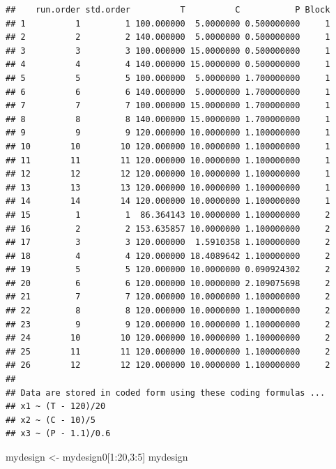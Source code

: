 \documentclass[
]{book}
\newenvironment{Shaded}{\begin{snugshade}}{\end{snugshade}}
\newcommand{\DecValTok}[1]{\textcolor[rgb]{0.00,0.00,0.81}{#1}}
\newcommand{\NormalTok}[1]{#1}
\newcommand{\OtherTok}[1]{\textcolor[rgb]{0.56,0.35,0.01}{#1}}
\newcommand{\SpecialCharTok}[1]{\textcolor[rgb]{0.00,0.00,0.00}{#1}}
\theoremstyle{definition}
\theoremstyle{definition}
\theoremstyle{definition}
\theoremstyle{definition}
\theoremstyle{remark}
\begin{document}
\begin{verbatim}
##    run.order std.order          T          C           P Block
## 1          1         1 100.000000  5.0000000 0.500000000     1
## 2          2         2 140.000000  5.0000000 0.500000000     1
## 3          3         3 100.000000 15.0000000 0.500000000     1
## 4          4         4 140.000000 15.0000000 0.500000000     1
## 5          5         5 100.000000  5.0000000 1.700000000     1
## 6          6         6 140.000000  5.0000000 1.700000000     1
## 7          7         7 100.000000 15.0000000 1.700000000     1
## 8          8         8 140.000000 15.0000000 1.700000000     1
## 9          9         9 120.000000 10.0000000 1.100000000     1
## 10        10        10 120.000000 10.0000000 1.100000000     1
## 11        11        11 120.000000 10.0000000 1.100000000     1
## 12        12        12 120.000000 10.0000000 1.100000000     1
## 13        13        13 120.000000 10.0000000 1.100000000     1
## 14        14        14 120.000000 10.0000000 1.100000000     1
## 15         1         1  86.364143 10.0000000 1.100000000     2
## 16         2         2 153.635857 10.0000000 1.100000000     2
## 17         3         3 120.000000  1.5910358 1.100000000     2
## 18         4         4 120.000000 18.4089642 1.100000000     2
## 19         5         5 120.000000 10.0000000 0.090924302     2
## 20         6         6 120.000000 10.0000000 2.109075698     2
## 21         7         7 120.000000 10.0000000 1.100000000     2
## 22         8         8 120.000000 10.0000000 1.100000000     2
## 23         9         9 120.000000 10.0000000 1.100000000     2
## 24        10        10 120.000000 10.0000000 1.100000000     2
## 25        11        11 120.000000 10.0000000 1.100000000     2
## 26        12        12 120.000000 10.0000000 1.100000000     2
## 
## Data are stored in coded form using these coding formulas ...
## x1 ~ (T - 120)/20
## x2 ~ (C - 10)/5
## x3 ~ (P - 1.1)/0.6
\end{verbatim}

\begin{Shaded}
\begin{Highlighting}[]
\NormalTok{mydesign }\OtherTok{\textless{}{-}}\NormalTok{ mydesign0[}\DecValTok{1}\SpecialCharTok{:}\DecValTok{20}\NormalTok{,}\DecValTok{3}\SpecialCharTok{:}\DecValTok{5}\NormalTok{]}
\NormalTok{mydesign}
\end{Highlighting}
\end{Shaded}
\end{document}
